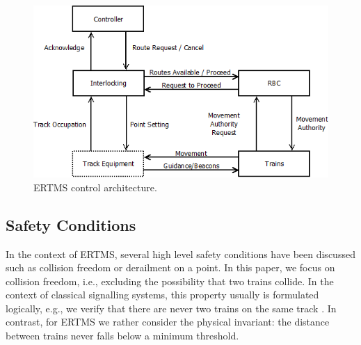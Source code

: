 \begin{figure}[H]
\centering
\includegraphics[scale=0.45]{images/Architecture.png}
\caption{ERTMS control architecture.}
\label{fig:arch}
\end{figure}

\subsection{Safety Conditions}
\label{sec:safetycond}
In the context of ERTMS, several high level safety conditions have
been discussed such as collision freedom or derailment on a point.  In
this paper, we focus on collision freedom, i.e., excluding the
possibility that two trains collide.  In the context of classical
signalling systems, this property usually is formulated logically,
e.g., we verify that there are never two trains on the same track
\cite{sttt14}. In contrast, for ERTMS we rather consider the physical
invariant: the distance between trains never falls below a
minimum threshold.


